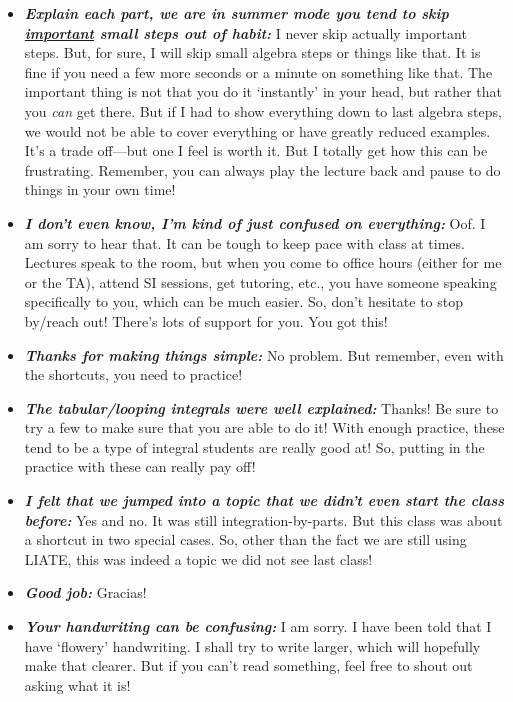 \documentclass[11pt,letterpaper]{article}
\begin{document}
\begin{itemize}
\item {\bfseries\itshape Explain each part, we are in summer mode you tend to skip \underline{important} small steps out of habit:} I never skip actually important steps. But, for sure, I will skip small algebra steps or things like that. It is fine if you need a few more seconds or a minute on something like that. The important thing is not that you do it `instantly' in your head, but rather that you \textit{can} get there. But if I had to show everything down to last algebra steps, we would not be able to cover everything or have greatly reduced examples. It's a trade off---but one I feel is worth it. But I totally get how this can be frustrating. Remember, you can always play the lecture back and pause to do things in your own time! 

\item {\bfseries\itshape I don't even know, I'm kind of just confused on everything:} Oof. I am sorry to hear that. It can be tough to keep pace with class at times. Lectures speak to the room, but when you come to office hours (either for me or the TA), attend SI sessions, get tutoring, etc., you have someone speaking specifically to you, which can be much easier. So, don't hesitate to stop by/reach out! There's lots of support for you. You got this!

\item {\bfseries\itshape Thanks for making things simple:} No problem. But remember, even with the shortcuts, you need to practice!

\item {\bfseries\itshape The tabular/looping integrals were well explained:} Thanks! Be sure to try a few to make sure that you are able to do it! With enough practice, these tend to be a type of integral students are really good at! So, putting in the practice with these can really pay off!

\item {\bfseries\itshape I felt that we jumped into a topic that we didn't even start the class before:} Yes and no. It was still integration-by-parts. But this class was about a shortcut in two special cases. So, other than the fact we are still using LIATE, this was indeed a topic we did not see last class!

\item {\bfseries\itshape Good job:} Gracias!

\item {\bfseries\itshape Your handwriting can be confusing:} I am sorry. I have been told that I have `flowery' handwriting. I shall try to write larger, which will hopefully make that clearer. But if you can't read something, feel free to shout out asking what it is!


\end{itemize}
\end{document}
